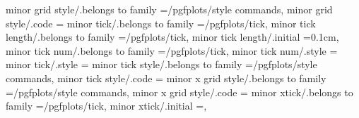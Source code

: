 minor grid style/.belongs to family                                =/pgfplots/style commands,                                                                                                          
minor grid style/.code                                             ={                                                                                                                                 
minor tick/.belongs to family                                      =/pgfplots/tick,                                                                                                                    
minor tick length/.belongs to family                               =/pgfplots/tick,                                                                                                                    
minor tick length/.initial                                         =0.1cm,                                                                                                                             
minor tick num/.belongs to family                                  =/pgfplots/tick,                                                                                                                    
minor tick num/.style                                              ={                                                                                                                                  
minor tick/.style                                                  ={                                                                                                                                  
minor tick style/.belongs to family                                =/pgfplots/style commands,                                                                                                          
minor tick style/.code                                             ={                                                                                                                                 
minor x grid style/.belongs to family                              =/pgfplots/style commands,                                                                                                          
minor x grid style/.code                                           ={                                                                                                                                 
minor xtick/.belongs to family                                     =/pgfplots/tick,                                                                                                                    
minor xtick/.initial                                               =,                                                                                                                                  
}}}}}
